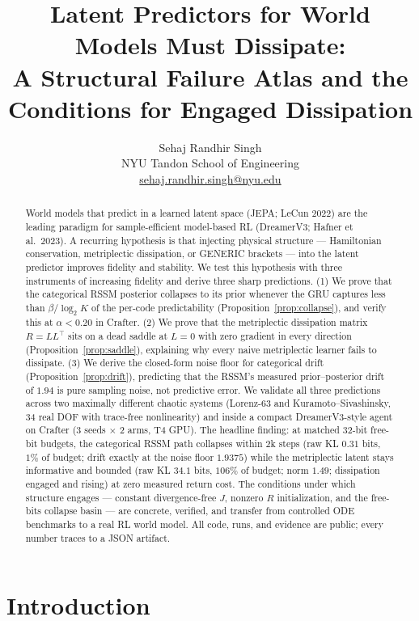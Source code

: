 \documentclass[preprint,12pt]{article}
\title{Latent Predictors for World Models Must Dissipate: \\
\large A Structural Failure Atlas and the Conditions for Engaged Dissipation}
\author{Sehaj Randhir Singh\\
NYU Tandon School of Engineering\\
\href{mailto:sehaj.randhir.singh@nyu.edu}{sehaj.randhir.singh@nyu.edu}}
\date{}
\begin{document}
\maketitle

\begin{abstract}
World models that predict in a learned latent space (JEPA; LeCun 2022) are
the leading paradigm for sample-efficient model-based RL (DreamerV3;
Hafner et al.\ 2023). A recurring hypothesis is that injecting physical
structure --- Hamiltonian conservation, metriplectic dissipation, or
 GENERIC brackets --- into the latent predictor improves fidelity and
stability. We test this hypothesis with three instruments of increasing
fidelity and derive three sharp predictions. (1) We prove that the
categorical RSSM posterior collapses to its prior whenever the GRU
captures less than $\beta / \log_2 K$ of the per-code predictability
(Proposition~\ref{prop:collapse}), and verify this at $\alpha < 0.20$ in
Crafter. (2) We prove that the metriplectic dissipation matrix
$R = LL^\top$ sits on a dead saddle at $L = 0$ with zero gradient in
every direction (Proposition~\ref{prop:saddle}), explaining why every
naive metriplectic learner fails to dissipate. (3) We derive the
closed-form noise floor for categorical drift (Proposition~\ref{prop:drift}),
predicting that the RSSM's measured prior--posterior drift of $1.94$ is
pure sampling noise, not predictive error. We validate all three
predictions across two maximally different chaotic systems (Lorenz-63 and
Kuramoto--Sivashinsky, 34 real DOF with trace-free nonlinearity) and
inside a compact DreamerV3-style agent on Crafter (3 seeds $\times$ 2 arms,
T4 GPU). The headline finding: at matched 32-bit free-bit budgets, the
categorical RSSM path collapses within 2k steps (raw KL $0.31$ bits,
$1\%$ of budget; drift exactly at the noise floor $1.9375$) while the
metriplectic latent stays informative and bounded (raw KL $34.1$ bits,
$106\%$ of budget; norm $1.49$; dissipation engaged and rising) at zero
measured return cost. The conditions under which structure engages ---
constant divergence-free $J$, nonzero $R$ initialization, and the
free-bits collapse basin --- are concrete, verified, and transfer from
controlled ODE benchmarks to a real RL world model. All code, runs, and
evidence are public; every number traces to a JSON artifact.
\end{abstract}

\section{Introduction}
\end{document}
